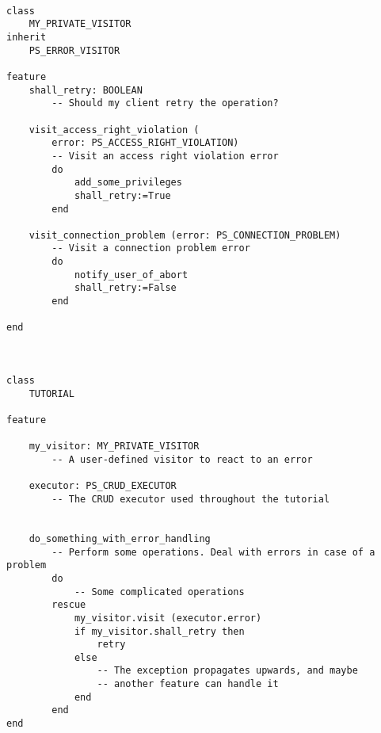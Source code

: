 \begin{lstlisting}[language=OOSC2Eiffel, captionpos=b, caption={}, label={lst:error_visitor_example}]

class
	MY_PRIVATE_VISITOR
inherit
	PS_ERROR_VISITOR

feature
	shall_retry: BOOLEAN
		-- Should my client retry the operation?

	visit_access_right_violation (
		error: PS_ACCESS_RIGHT_VIOLATION)
		-- Visit an access right violation error
		do
			add_some_privileges
			shall_retry:=True
		end

	visit_connection_problem (error: PS_CONNECTION_PROBLEM)
		-- Visit a connection problem error
		do
			notify_user_of_abort
			shall_retry:=False
		end

end



class
	TUTORIAL

feature

	my_visitor: MY_PRIVATE_VISITOR
		-- A user-defined visitor to react to an error

	executor: PS_CRUD_EXECUTOR
		-- The CRUD executor used throughout the tutorial


	do_something_with_error_handling
		-- Perform some operations. Deal with errors in case of a problem
		do
			-- Some complicated operations
		rescue
			my_visitor.visit (executor.error)
			if my_visitor.shall_retry then
				retry
			else
				-- The exception propagates upwards, and maybe
				-- another feature can handle it
			end
		end
end

\end{lstlisting}



